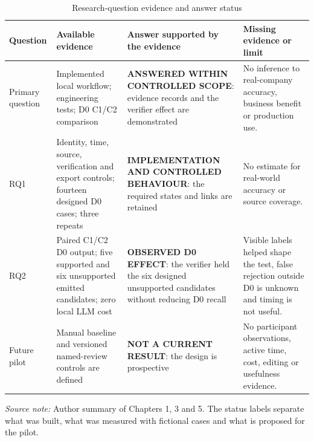 \begin{table}[!htbp]
  \centering
  \scriptsize
  \setlength{\tabcolsep}{4pt}
  \renewcommand{\arraystretch}{1.10}
  \begin{tabularx}{\textwidth}{@{}P{0.12\textwidth}P{0.30\textwidth}P{0.27\textwidth}Y@{}}
    \toprule
    \textbf{Question} & \textbf{Available evidence} & \textbf{Answer supported by the evidence} & \textbf{Missing evidence or limit} \\
    \midrule
    Primary question & Implemented local workflow; engineering tests; D0 C1/C2 comparison & \textbf{ANSWERED WITHIN CONTROLLED SCOPE}: evidence records and the verifier effect are demonstrated & No inference to real-company accuracy, business benefit or production use. \\
    \addlinespace
    RQ1 & Identity, time, source, verification and export controls; fourteen designed D0 cases; three repeats & \textbf{IMPLEMENTATION AND CONTROLLED BEHAVIOUR}: the required states and links are retained & No estimate for real-world accuracy or source coverage. \\
    \addlinespace
    RQ2 & Paired C1/C2 D0 output; five supported and six unsupported emitted candidates; zero local LLM cost & \textbf{OBSERVED D0 EFFECT}: the verifier held the six designed unsupported candidates without reducing D0 recall & Visible labels helped shape the test, false rejection outside D0 is unknown and timing is not useful. \\
    \addlinespace
    Future pilot & Manual baseline and versioned named-review controls are defined & \textbf{NOT A CURRENT RESULT}: the design is prospective & No participant observations, active time, cost, editing or usefulness evidence. \\
    \bottomrule
  \end{tabularx}

  \caption{Research-question evidence and answer status}
  \label{tab:disc-rq-evidence-status}

  \vspace{4pt}
  \parbox{\textwidth}{\scriptsize
    \textit{Source note:} Author summary of Chapters 1, 3 and 5. The status labels separate what
    was built, what was measured with fictional cases and what is proposed for the pilot.}
\end{table}
